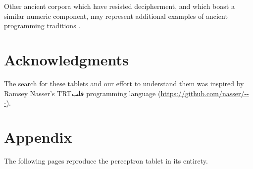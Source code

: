 \documentclass[11pt]{article}
\newcommand{\textarabic}[1]     %
    {\bgroup\textdir TRT\arabicfont #1\egroup}
\begin{document}
Other ancient corpora which have resisted decipherment, and which boast a similar numeric component, may represent additional examples of ancient programming traditions \cite{kelley2022}.

\section*{Acknowledgments}
The search for these tablets and our effort to understand them was inspired by Ramsey Nasser's \textarabic{قلب} programming language (\url{https://github.com/nasser/---}).



\appendix

\section{Appendix}
\label{sec:appendix}

The following pages reproduce the perceptron tablet in its entirety.

\onecolumn
\tiny
\noindent

\normalsize
\end{document}
